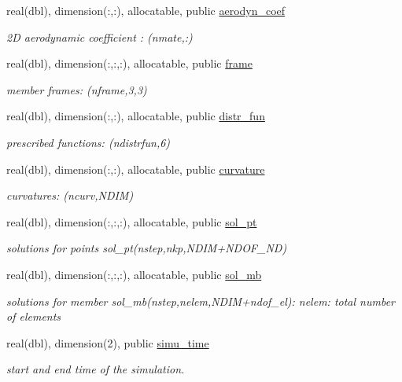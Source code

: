 \begin{DoxyCompactItemize}
real(dbl), dimension(\+:,\+:), allocatable, public \hyperlink{namespaceioaero_a116b30aa43f6d871e7d4a3ed6f4428c3}{aerodyn\+\_\+coef}
\begin{DoxyCompactList}\small\item\em 2D aerodynamic coefficient \+: (nmate,\+:) \end{DoxyCompactList}\item 
real(dbl), dimension(\+:,\+:,\+:), allocatable, public \hyperlink{namespaceioaero_a26d467b1adbb838f4b1ba3dd4ee1ea0d}{frame}
\begin{DoxyCompactList}\small\item\em member frames\+: (nframe,3,3) \end{DoxyCompactList}\item 
real(dbl), dimension(\+:,\+:), allocatable, public \hyperlink{namespaceioaero_a1d7c3689e30c2925cd403a84e9176242}{distr\+\_\+fun}
\begin{DoxyCompactList}\small\item\em prescribed functions\+: (ndistrfun,6) \end{DoxyCompactList}\item 
real(dbl), dimension(\+:,\+:), allocatable, public \hyperlink{namespaceioaero_ab2bc17b64328528015d161cab6490b80}{curvature}
\begin{DoxyCompactList}\small\item\em curvatures\+: (ncurv,N\+D\+IM) \end{DoxyCompactList}\item 
real(dbl), dimension(\+:,\+:,\+:), allocatable, public \hyperlink{namespaceioaero_af6e62942bb38b7b7d69ea25972fe00bf}{sol\+\_\+pt}
\begin{DoxyCompactList}\small\item\em solutions for points sol\+\_\+pt(nstep,nkp,N\+D\+I\+M+\+N\+D\+O\+F\+\_\+\+ND) \end{DoxyCompactList}\item 
real(dbl), dimension(\+:,\+:,\+:), allocatable, public \hyperlink{namespaceioaero_a4933d28025772ee22892dc12780a8eef}{sol\+\_\+mb}
\begin{DoxyCompactList}\small\item\em solutions for member sol\+\_\+mb(nstep,nelem,N\+D\+I\+M+ndof\+\_\+el)\+: nelem\+: total number of elements \end{DoxyCompactList}\item 
real(dbl), dimension(2), public \hyperlink{namespaceioaero_ab6c271c9ebbeb9a315ec53d38facb60b}{simu\+\_\+time}
\begin{DoxyCompactList}\small\item\em start and end time of the simulation. \end{DoxyCompactList}\item 

\end{DoxyCompactItemize}
